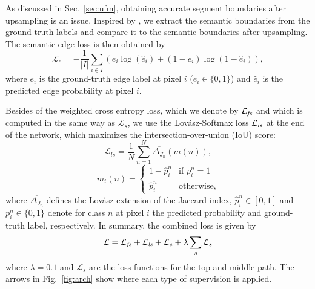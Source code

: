 \documentclass[letterpaper, 10 pt, journal, twoside]{ieeetran}
\newcommand{\figref}[1]{Fig.~\ref{#1}}
\newcommand{\secref}[1]{Sec.~\ref{#1}}
\newcommand{\todo}[1]{#1}
\begin{document}
As discussed in \secref{sec:ufm}, obtaining accurate segment boundaries after upsampling is an issue. 
Inspired by \cite{yu2018learning,kirillov2017instancecut}, we extract the semantic boundaries from the ground-truth labels and compare it to the semantic boundaries after upsampling. The semantic edge loss is then obtained by
\begin{equation}\label{eq:E}
    \mathcal{L}_e = -\frac{1}{|I|}\sum_{i\in I}\left(e_i \log(\hat{e}_i) + (1-e_i)\log(1-\hat{e}_i)\right),
\end{equation}
where $e_i$ is the ground-truth edge label at pixel $i$ ($e_i\in\{0,1\}$)
and $\hat{e}_i$ is the predicted edge probability at pixel $i$.



Besides of the weighted cross entropy loss, which we denote by $\mathcal{L}_\textit{\text{fs}}$ and which is computed in the same way as $\mathcal{L}_{s}$, we use the Lov\'asz-Softmax loss $\mathcal{L}_\textit{\text{ls}}$ \cite{berman2018lovasz} at the end of the network, which maximizes the intersection-over-union (IoU) score:
\begin{equation}
\mathcal{L}_{l s}=\frac{1}{N} \sum_{n=1}^{N} \overline{\Delta_{J_{n}}}(m(n)),
\end{equation}
\begin{equation}
m_{i}(n)=\left\{\begin{array}{ll}
1 - \hat{p}_i^n & \text{if } p_i^n=1 \\
\hat{p}_i^n & \text{otherwise},
\end{array}\right.
\end{equation}
where $\overline{\Delta_{J_{n}}}$ defines the Lov\'asz extension of the Jaccard index, $\hat{p}_i^n \in [0, 1]$  and $p_i^n \in \{0, 1\}$  denote for class $n$ at pixel $i$ the predicted probability and ground-truth label, respectively.
In summary, the combined loss is given by
\begin{equation}
    \mathcal{L} = \mathcal{L}_\textit{\text{fs}} + \mathcal{L}_\textit{\text{ls}} + \mathcal{L}_{e} + \lambda\sum_s \mathcal{L}_{s}
\label{equ:loss}
\end{equation}
where $\lambda=0.1$ and $\mathcal{L}_{s}$ are the loss functions for the top and middle path. 
\todo{The arrows in \figref{fig:arch} show where each type of supervision is applied.}
\end{document}
